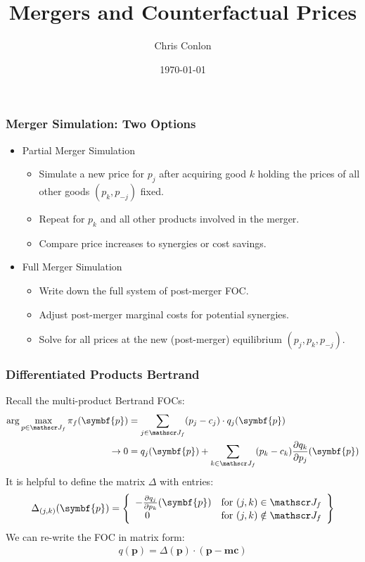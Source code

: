 \documentclass[aspectratio=169,10pt]{beamer}
\title{Mergers and Counterfactual Prices}
\author{Chris Conlon}
\institute{Grad IO}
\date{\today}
\begin{document}
\frame{\titlepage}

\begin{frame}
\frametitle{Merger Simulation: Two Options}
 \begin{itemize}
\item Partial Merger Simulation
 \begin{itemize}
\item Simulate a new price for $p_j$ after acquiring good $k$ holding the prices of all other goods $(p_k,p_{-j})$ fixed.
\item Repeat for $p_k$ and all other products involved in the merger.
\item Compare price increases to \alert{synergies} or cost savings.
 \end{itemize}
 \item Full Merger Simulation
 \begin{itemize}
\item Write down the full system of post-merger FOC.
\item Adjust post-merger marginal costs for potential synergies.
\item Solve for all prices at the new (post-merger) equilibrium $(p_j,p_k,p_{-j})$.
 \end{itemize}
 \end{itemize}
\end{frame}

\begin{frame}
\frametitle{Differentiated Products Bertrand}
\small
Recall the multi-product Bertrand FOCs:
\begin{align*}
\arg \max_{p \in \calJ_f} \pi_f (\symbf{p}) &= \sum_{j \in \calJ_f} (p_j - c_j) \cdot q_j(\symbf{p}) \\
\rightarrow 0&= q_j(\symbf{p}) + \sum_{k \in \calJ_f} (p_k - c_k) \frac{\partial q_{k}}{\partial p_j}(\symbf{p})
\end{align*}
It is helpful to define the matrix $\Delta$ with entries:
\begin{align*}
\Delta_{(j,k)}(\symbf{p}) = \left\{\begin{array}{lr}
         - \frac{\partial q_{j}}{\partial p_k}(\symbf{p}) & \text{for }  (j,k) \in \calJ_f\\
       	  \quad 0 & \text{for } (j,k) \notin \calJ_f
        \end{array} \right\}
\end{align*}
We can re-write the FOC in matrix form:
\begin{align*}
q(\symbf{p}) = \Delta(\symbf{p})\cdot(\symbf{p}-\symbf{mc})
\end{align*}
\end{frame}
\end{document}
